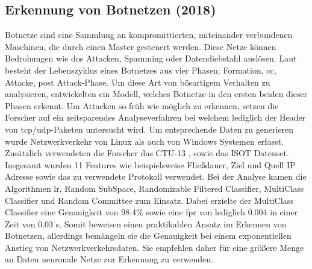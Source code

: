 \documentclass[
    12pt, %
    DIV10,
    ngerman, %
    a4paper, %
    oneside, %
    titlepage, %
    parskip=half, %
    headings=normal, %
    listof=totoc, %
    bibliography=totoc, %
    index=totoc, %
    captions=tableheading, %
    final %
]{scrreprt}
\begin{document}
\subsection{Erkennung von Botnetzen (2018)}\label{ctu}
Botnetze sind eine Sammlung an kompromittierten, miteinander verbundenen Maschinen, die durch einen Master gesteuert werden. Diese Netze können Bedrohungen wie \ac{dos} Attacken, Spamming oder Datendiebstahl auslösen. Laut \textcite{leonard2009framework} besteht der Lebenszyklus eines Botnetzes aus vier Phasen: Formation, \ac{cc}, Attacke, post Attack-Phase. Um diese Art von bösartigem Verhalten zu analysieren, entwickelten \textcite{Mathur2018} ein Modell, welches Botnetze in den ersten beiden dieser Phasen erkennt. Um Attacken so früh wie möglich zu erkennen, setzen die Forscher auf ein zeitsparendes Analyseverfahren bei welchem lediglich der Header von \ac{tcp}/\ac{udp}-Paketen untersucht wird. Um entsprechende Daten zu generieren wurde Netzwerkverkehr von Linux als auch von Windows Systemen erfasst. Zusätzlich verwendeten die Forscher das CTU-13 \parencite{garcia2014empirical}, sowie das ISOT \parencite{isot} Datenset. Insgesamt wurden 11 Features wie beispielsweise Flie{\ss}dauer, Ziel und Quell IP Adresse sowie das zu verwendete Protokoll verwendet. Bei der Analyse kamen die Algorithmen \ac{lr}, Random SubSpace, Randomizable Filtered Classifier, MultiClass Classifier und Random Committee zum Einsatz. Dabei erzielte der MultiClass Classifier eine Genauigkeit von 98.4\% sowie eine \ac{fpr} von lediglich 0.004 in einer Zeit von 0.03 s. Somit beweisen \textcite{Mathur2018} einen praktikablen Ansatz im Erkennen von Botnetzen, allerdings bemängeln sie die Genauigkeit bei einem exponentiellen Anstieg von Netzwerkverkehrsdaten. Sie empfehlen daher für eine grö{\ss}ere Menge an Daten neuronale Netze zur Erkennung zu verwenden.
%
\end{document}
